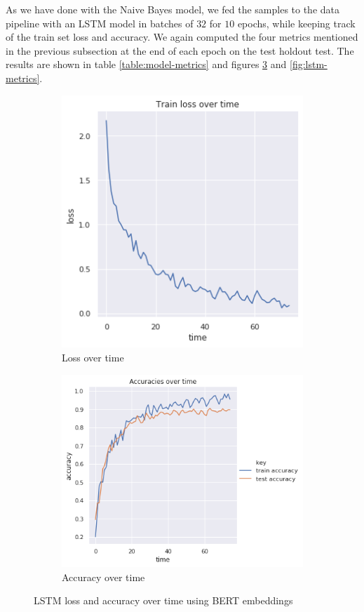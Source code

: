 \documentclass[12pt]{extreport}
\begin{document}
As we have done with the Naive Bayes model, we fed the samples to the data pipeline with an LSTM model in batches of $32$ for $10$ epochs, while keeping track of the train set loss and accuracy. We again computed the four metrics mentioned in the previous subsection at the end of each epoch on the test holdout test. The results are shown in table \ref{table:model-metrics} and figures \ref{fig:lstm-loss-acc} and \ref{fig:lstm-metrics}.

\begin{figure}[H]
\centering
\begin{subfigure}{.5\textwidth}
  \centering
  \includegraphics[width=.76\linewidth]{assets/framework/lstm_BERT_loss_holdout.png}
  \caption{Loss over time}
  \label{fig:lstm-loss}
\end{subfigure}%
\begin{subfigure}{.5\textwidth}
  \centering
  \includegraphics[width=\linewidth]{assets/framework/lstm_BERT_accuracy_holdout.png}
  \caption{Accuracy over time}
  \label{fig:lstm-acc}
\end{subfigure}
\caption{LSTM loss and accuracy over time using BERT embeddings}
\label{fig:lstm-loss-acc}
\end{figure}
\end{document}
